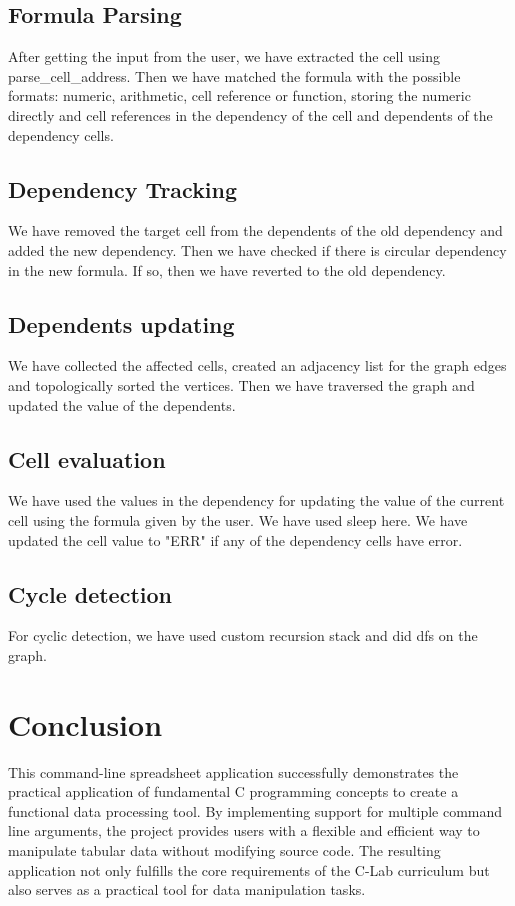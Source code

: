 \documentclass{article}
\begin{document}
\subsection{Formula Parsing}
After getting the input from the user, we have extracted the cell using parse\_cell\_address.
Then we have matched the formula with the possible formats: numeric, arithmetic, cell reference or function, storing the numeric directly and cell references in the dependency of the cell and dependents of the dependency cells.

\subsection{Dependency Tracking}
We have removed the target cell from the dependents of the old dependency and added the new dependency. Then we have checked if there is circular dependency in the new formula. If so, then we have reverted to the old dependency. 

\subsection{Dependents updating}
    We have collected the affected cells, created an adjacency list for the graph edges and topologically sorted the vertices. Then we have traversed the graph and updated the value of the dependents.
    
\subsection{Cell evaluation}
    We have used the values in the dependency for updating the value of the current cell using the formula given by the user. We have used sleep here. We have updated the cell value to "ERR" if any of the dependency cells have error.

\subsection{Cycle detection}
    For cyclic detection, we have used custom recursion stack and did dfs on the graph.

\section{Conclusion}
This command-line spreadsheet application successfully demonstrates the practical application of fundamental C programming concepts to create a functional data processing tool.
By implementing support for multiple command line arguments, the project provides users
with a flexible and efficient way to manipulate tabular data without modifying source code.
The resulting application not only fulfills the core requirements of the C-Lab curriculum but
also serves as a practical tool for data manipulation tasks.
\end{document}

